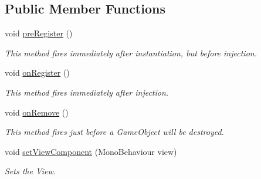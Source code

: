 \subsection*{Public Member Functions}
\begin{DoxyCompactItemize}
\item 
void \hyperlink{interfacestrange_1_1extensions_1_1mediation_1_1api_1_1_i_mediator_a9965bc773cde6f889ec7528ade52267e}{pre\-Register} ()
\begin{DoxyCompactList}\small\item\em This method fires immediately after instantiation, but before injection. \end{DoxyCompactList}\item 
void \hyperlink{interfacestrange_1_1extensions_1_1mediation_1_1api_1_1_i_mediator_a84249d82961c687d821631718fc40cda}{on\-Register} ()
\begin{DoxyCompactList}\small\item\em This method fires immediately after injection. \end{DoxyCompactList}\item 
void \hyperlink{interfacestrange_1_1extensions_1_1mediation_1_1api_1_1_i_mediator_a7d1c9db89dbe71b80f0fb56fd3012def}{on\-Remove} ()
\begin{DoxyCompactList}\small\item\em This method fires just before a Game\-Object will be destroyed. \end{DoxyCompactList}\item 
\hypertarget{interfacestrange_1_1extensions_1_1mediation_1_1api_1_1_i_mediator_a8edf78791fb2d4759284fd0ad487542b}{void \hyperlink{interfacestrange_1_1extensions_1_1mediation_1_1api_1_1_i_mediator_a8edf78791fb2d4759284fd0ad487542b}{set\-View\-Component} (Mono\-Behaviour view)}\label{interfacestrange_1_1extensions_1_1mediation_1_1api_1_1_i_mediator_a8edf78791fb2d4759284fd0ad487542b}

\begin{DoxyCompactList}\small\item\em Sets the View. \end{DoxyCompactList}\end{DoxyCompactItemize}
